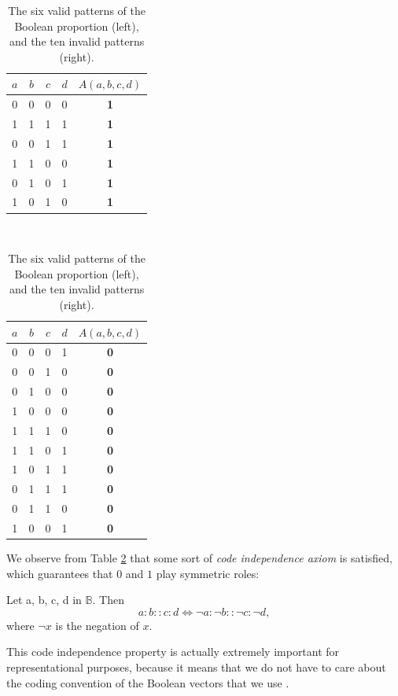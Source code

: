 \begin{table}[t]
  \centering
  \begin{tabular}[t]{ccccc}
    \toprule
    $a$ & $b$ & $c$ & $d$ &  $A(a, b, c, d)$\\
    \midrule
    0 & 0 & 0 & 0 &   \textbf{1}\\
    1 & 1 & 1 & 1 &   \textbf{1}\\
    0 & 0 & 1 & 1 &   \textbf{1}\\
    1 & 1 & 0 & 0 &   \textbf{1}\\
    0 & 1 & 0 & 1 &   \textbf{1}\\
    1 & 0 & 1 & 0 &   \textbf{1}\\
    \bottomrule
  \end{tabular}
  ~~~~
  \begin{tabular}[t]{ccccc}
    \toprule
    $a$ & $b$ & $c$ & $d$ &  $A(a, b, c, d)$\\
    \midrule
    0 & 0 & 0 & 1 &   \textbf{0}\\
    0 & 0 & 1 & 0 &   \textbf{0}\\
    0 & 1 & 0 & 0 &   \textbf{0}\\
    1 & 0 & 0 & 0 &   \textbf{0}\\
    1 & 1 & 1 & 0 &   \textbf{0}\\
    1 & 1 & 0 & 1 &   \textbf{0}\\
    1 & 0 & 1 & 1 &   \textbf{0}\\
    0 & 1 & 1 & 1 &   \textbf{0}\\
    0 & 1 & 1 & 0 &   \textbf{0}\\
    1 & 0 & 0 & 1 &   \textbf{0}\\
    \bottomrule
  \end{tabular}
  \caption{The six valid patterns of the Boolean proportion (left), and the ten
  invalid patterns (right).}
  \label{TAB:six_valid_patterns}
\end{table}

We observe from Table \ref{TAB:six_valid_patterns} that some
sort of {\it code independence axiom} is satisfied, which guarantees that $0$
and $1$ play symmetric roles:
\begin{property}
  \label{PROPER:code_indep}
  Let a, b, c, d in $\mathbb{B}$. Then
  $$a : b :: c : d \iff \neg a :  \neg b ::  \neg c :  \neg d,$$
  where $\neg x$ is the negation of $x$.
\end{property}
This code independence property is actually extremely important for
representational purposes, because it means that we do not have to care about
the coding convention of the Boolean vectors that we use \cite{PraRic13LU}.

